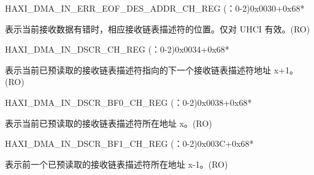 \begin{register}{H}{AXI\_DMA\_IN\_ERR\_EOF\_DES\_ADDR\_CH\_REG (：0-2)}{0x0030+0x68*}\label{regdesc:AXIDMAINERREOFDESADDRCHNREG}
%
\regnewline%
\begin{regdesc}\begin{reglist}
\label{fielddesc:AXIDMAINERREOFDESADDRCHN}\item [AXI\_DMA\_IN\_ERR\_EOF\_DES\_ADDR\_CH\regindex{n}] 表示当前接收数据有错时，相应接收链表描述符的位置。仅对 UHCI 有效。(RO)
\end{reglist}\end{regdesc}
\end{register}


\begin{register}{H}{AXI\_DMA\_IN\_DSCR\_CH\_REG (：0-2)}{0x0034+0x68*}\label{regdesc:AXIDMAINDSCRCHNREG}
%
\regnewline%
\begin{regdesc}\begin{reglist}
\label{fielddesc:AXIDMAINLINKDSCRCHN}\item [AXI\_DMA\_INLINK\_DSCR\_CH\regindex{n}] 表示当前已预读取的接收链表描述符指向的下一个接收链表描述符地址 x+1。(RO)
\end{reglist}\end{regdesc}
\end{register}


\begin{register}{H}{AXI\_DMA\_IN\_DSCR\_BF0\_CH\_REG (：0-2)}{0x0038+0x68*}\label{regdesc:AXIDMAINDSCRBF0CHNREG}
%
\regnewline%
\begin{regdesc}\begin{reglist}
\label{fielddesc:AXIDMAINLINKDSCRBF0CHN}\item [AXI\_DMA\_INLINK\_DSCR\_BF0\_CH\regindex{n}] 表示当前已预读取的接收链表描述符所在地址 x。(RO)
\end{reglist}\end{regdesc}
\end{register}


\begin{register}{H}{AXI\_DMA\_IN\_DSCR\_BF1\_CH\_REG (：0-2)}{0x003C+0x68*}\label{regdesc:AXIDMAINDSCRBF1CHNREG}
%
\regnewline%
\begin{regdesc}\begin{reglist}
\label{fielddesc:AXIDMAINLINKDSCRBF1CHN}\item [AXI\_DMA\_INLINK\_DSCR\_BF1\_CH\regindex{n}] 表示前一个已预读取的接收链表描述符所在地址 x-1。(RO)
\end{reglist}\end{regdesc}
\end{register}


